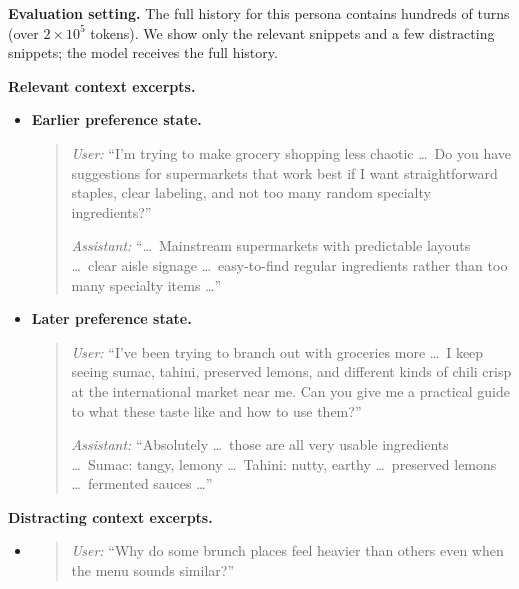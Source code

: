 \documentclass{llmxive}
\begin{document}
\begin{tcolorbox}[
    colback=gray!4,
    colframe=black!75,
    title={Example: PersonaMem-Evo OOD item with temporal preference evolution},
    fonttitle=\bfseries,
    breakable,
    enhanced,
    before skip=4pt,
    after skip=4pt,
    enlargepage flexible,
    pad at break*=1mm
]
\small

\textbf{Evaluation setting.}
The full history for this persona contains hundreds of turns (over $2\times 10^5$ tokens). We show only the relevant snippets and a few distracting snippets; the model receives the full history.

\vspace{0.5em}
\textbf{Relevant context excerpts.}

\begin{itemize}[leftmargin=1.5em]
    \item \textbf{Earlier preference state.}
    \begin{quote}
    \textit{User:} ``I'm trying to make grocery shopping less chaotic \ldots\ Do you have suggestions for supermarkets that work best if I want straightforward staples, clear labeling, and not too many random specialty ingredients?''

    \textit{Assistant:} ``\ldots\ Mainstream supermarkets with predictable layouts \ldots\ clear aisle signage \ldots\ easy-to-find regular ingredients rather than too many specialty items \ldots''
    \end{quote}

    \item \textbf{Later preference state.}
    \begin{quote}
    \textit{User:} ``I've been trying to branch out with groceries more \ldots\ I keep seeing sumac, tahini, preserved lemons, and different kinds of chili crisp at the international market near me. Can you give me a practical guide to what these taste like and how to use them?''

    \textit{Assistant:} ``Absolutely \ldots\ those are all very usable ingredients \ldots\ Sumac: tangy, lemony \ldots\ Tahini: nutty, earthy \ldots\ preserved lemons \ldots\ fermented sauces \ldots''
    \end{quote}
\end{itemize}

\vspace{0.5em}
\textbf{Distracting context excerpts.}

\begin{itemize}[leftmargin=1.5em]
    \item
    \begin{quote}
    \textit{User:} ``Why do some brunch places feel heavier than others even when the menu sounds similar?''
    \end{quote}


\end{itemize}
\end{tcolorbox}
\end{document}

